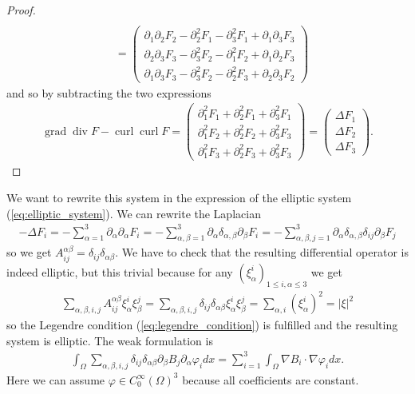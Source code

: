 \documentclass[12pt,a4paper]{article}
\numberwithin{equation}{subsection}
\numberwithin{lemma}{subsection}
\theoremstyle{definition}
\DeclareMathOperator{\curl}{curl}
\DeclareMathOperator{\diver}{div}
\DeclareMathOperator{\grad}{grad}
\begin{document}
\begin{proof}
\begin{align*}
        \\ &= \begin{pmatrix}
            \partial_1 \partial_2 F_2 - \partial^2_2 F_1 - \partial_3^2 F_1
            + \partial_1 \partial_3 F_3 
            \\ \partial_2 \partial_3 F_3 - \partial^2_3 F_2 - \partial_1^2 F_2
            + \partial_1 \partial_2 F_3
            \\ \partial_1 \partial_3 F_3 - \partial^2_3 F_2 - \partial_2^2 F_3
            + \partial_2 \partial_3 F_2  
            \end{pmatrix}
    \end{align*}
    and so by subtracting the two expressions
    \begin{align*}
        \grad \diver F - \curl \curl F  
        = \begin{pmatrix}
            \partial_1^2 F_1 + \partial_2^2 F_1 + \partial_3^2 F_1
            \\ \partial_1^2 F_2 + \partial_2^2 F_2 + \partial_3^2 F_3
            \\ \partial_1^2 F_3 + \partial_2^2 F_3 + \partial_3^2 F_3
        \end{pmatrix}
        = \begin{pmatrix}
            \Delta F_1 \\ \Delta F_2 \\ \Delta F_3
        \end{pmatrix}.
    \end{align*}
\end{proof}
We want to rewrite this system in the expression of the elliptic system 
(\ref{eq:elliptic_system}). We can rewrite the Laplacian
\begin{align*}
    - \Delta F_i = - \sum\limits_{\alpha = 1}^3 
        \partial_\alpha \partial_\alpha F_i
    = - \sum\limits_{\alpha,\beta = 1}^3 
    \partial_\alpha \delta_{\alpha,\beta} \partial_\beta F_i
    = - \sum\limits_{\alpha,\beta,j = 1}^3 
    \partial_\alpha \delta_{\alpha,\beta} \delta_{ij} \partial_\beta F_j
\end{align*}
so we get $A_{ij}^{\alpha\beta} = \delta_{ij} \delta_{\alpha \beta}$.
We have to check that the resulting differential operator is indeed
elliptic, but this trivial because for any 
$(\xi_\alpha^i)_{1\leq i,\alpha \leq 3}$
we get 
\begin{align*}
    \sum\limits_{\alpha,\beta,i,j} A_{ij}^{\alpha\beta} \xi_\alpha^i \xi_\beta^j 
    = \sum\limits_{\alpha,\beta,i,j} \delta_{ij} \delta_{\alpha \beta} 
        \xi_\alpha^i \xi_\beta^j 
    = \sum\limits_{\alpha,i} (\xi_\alpha^i)^2 = |\xi|^2
\end{align*}
so  the Legendre condition (\ref{eq:legendre_condition}) 
is fulfilled and the resulting system is elliptic. The weak formulation 
is 
\begin{align*}
    \int_\Omega \sum\limits_{\alpha,\beta,i,j} \delta_{ij} \delta_{\alpha\beta}
        \partial_\beta B_j \partial_\alpha \varphi_i dx 
    = \sum\limits_{i=1}^3 \int_\Omega \nabla B_i \cdot \nabla \varphi_i dx.
\end{align*}
Here we can assume $\varphi \in C_0^\infty (\Omega)^3$ because all coefficients
are constant.
\end{document}

